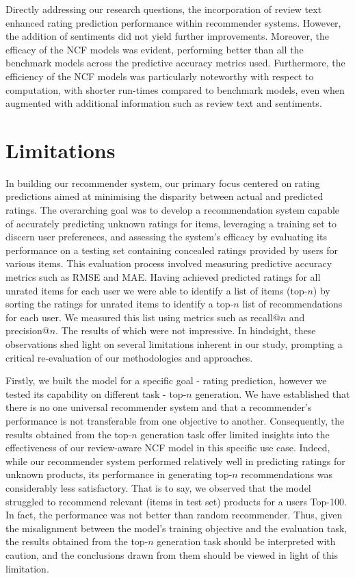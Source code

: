 Directly addressing our research questions, the incorporation of review text enhanced rating prediction performance within recommender systems. However, the addition of sentiments did not yield further improvements. Moreover, the efficacy of the NCF models was evident, performing better than all the benchmark models across the predictive accuracy metrics used. Furthermore, the efficiency of the NCF models was particularly noteworthy with respect to computation, with shorter run-times compared to benchmark models, even when augmented with additional information such as review text and sentiments. 


\section{Limitations}
\label{sec:6 Limitations}

In building our recommender system, our primary focus centered on rating predictions aimed at minimising the disparity between actual and predicted ratings. The overarching goal was to develop a recommendation system capable of accurately predicting unknown ratings for items, leveraging a training set to discern user preferences, and assessing the system's efficacy by evaluating its performance on a testing set containing concealed ratings provided by users for various items. This evaluation process involved measuring predictive accuracy metrics such as RMSE and MAE. Having achieved predicted ratings for all unrated items for each user we were able to identify a list of items (top-$n$) by sorting the ratings for unrated items to identify a top-$n$ list of recommendations for each user. We measured this list using metrics such as recall@$n$ and precision@$n$. The results of which were not impressive. In hindsight, these observations shed light on several limitations inherent in our study, prompting a critical re-evaluation of our methodologies and approaches.

Firstly, we built the model for a specific goal - rating prediction, however we tested its capability on different task - top-$n$ generation. We have established that there is no one universal recommender system \cite{lu2012recommender} and that a recommender's performance is not transferable from one objective to another. Consequently, the results obtained from the top-$n$ generation task offer limited insights into the effectiveness of our review-aware NCF model in this specific use case. Indeed, while our recommender system performed relatively well in predicting ratings for unknown products, its performance in generating top-$n$ recommendations was considerably less satisfactory. That is to say, we observed that the model struggled to recommend relevant (items in test set) products for a users Top-100. In fact, the performance was not better than random recommender. Thus, given the misalignment between the model's training objective and the evaluation task, the results obtained from the top-$n$ generation task should be interpreted with caution, and the conclusions drawn from them should be viewed in light of this limitation. 


